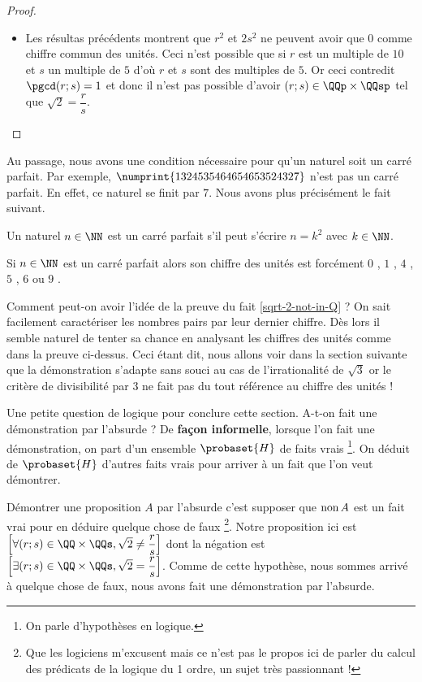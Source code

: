 \begin{proof}
\begin{itemize}[label=\small\textbullet]
		\item Les résultas précédents montrent que $r^2$ et $2 s^2$ ne peuvent avoir que $0$ comme chiffre commun des unités.
		Ceci n'est possible que si $r$ est un multiple de $10$ et $s$ un multiple de $5$ d'où $r$ et $s$ sont des multiples de $5$.
		Or ceci contredit $\pgcd(r ; s) = 1$ 
		et donc il n'est pas possible d'avoir $(r ; s) \in \QQp \times \QQsp$ tel que $\sqrt2 = \dfrac{r}{s}$.
	\end{itemize}
\end{proof}


Au passage, nous avons une condition nécessaire pour qu'un naturel soit un carré parfait. Par exemple, $\numprint{1324535464654653524327}$ n'est pas un carré parfait. En effet, ce naturel se finit par $7$. Nous avons plus précisément le fait suivant.


\begin{fact} \label{perfect-square-last-digit}
	Un naturel $n \in \NN$ est un carré parfait s'il peut s'écrire $n = k^2$ avec $k \in \NN$.
	
	\medskip
	
	Si $n \in \NN$ est un carré parfait alors son chiffre des unités est forcément $0$ , $1$ , $4$ , $5$  , $6$ ou $9$ .
\end{fact}


\begin{remark}
	Comment peut-on avoir l'idée de la preuve du fait \ref{sqrt-2-not-in-Q} ? 
	On sait facilement caractériser les nombres pairs par leur dernier chiffre. Dès lors il semble naturel de tenter sa chance en analysant les chiffres des unités comme dans la preuve ci-dessus.
	Ceci étant dit, nous allons voir dans la section suivante que la démonstration s'adapte sans souci au cas de l'irrationalité de $\sqrt3$ or le critère de divisibilité par $3$ ne fait pas du tout référence au chiffre des unités !
\end{remark}


\begin{remark}
	Une petite question de logique pour conclure cette section.
	A-t-on fait une démonstration par l'absurde ? 
	De \textbf{façon informelle}, lorsque l'on fait une démonstration, on part d'un ensemble $\probaset{H}$ de faits vrais
	\footnote{
		On parle d'hypothèses en logique.
	}.
	On déduit de $\probaset{H}$ d'autres faits vrais pour arriver à un fait que l'on veut démontrer.
	
	\smallskip
	
	Démontrer une proposition $A$ par l'absurde c'est supposer que $\text{\normalfont non \!} A$ est un fait vrai pour en déduire quelque chose de faux
	\footnote{
		Que les logiciens m'excusent mais ce n'est pas le propos ici de parler du calcul des prédicats de la logique du 1\ier{} ordre, un sujet très passionnant !
	}.
	Notre proposition ici est
	$\left[ \forall (r ; s) \in \QQ \times \QQs , \sqrt2 \neq \dfrac{r}{s} \right]$
	dont la négation est 
	$\left[ \exists (r ; s) \in \QQ \times \QQs , \sqrt2 = \dfrac{r}{s} \right]$.
	Comme de cette hypothèse, nous sommes arrivé à quelque chose de faux, nous avons fait une démonstration par l'absurde.	
\end{remark}

